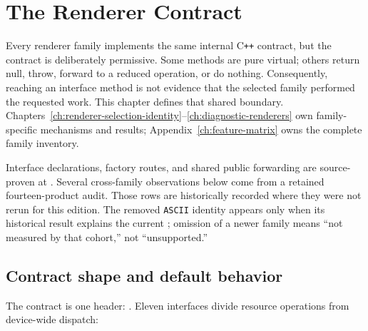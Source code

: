 \chapter{The Renderer Contract}
\label{ch:renderer-contract}
\label{ch:backend-architecture}

Every renderer family implements the same internal C\texttt{++} contract, but the contract is
deliberately permissive. Some methods are pure virtual; others return null, throw, forward to a
reduced operation, or do nothing. Consequently, reaching an interface method is not evidence
that the selected family performed the requested work. This chapter defines that shared boundary.
Chapters~\ref{ch:renderer-selection-identity}--\ref{ch:diagnostic-renderers} own family-specific
mechanisms and results; Appendix~\ref{ch:feature-matrix} owns the complete family inventory.

\begin{evidencenote}
Interface declarations, factory routes, and shared public forwarding are source-proven at
\CnaRevisionShort. Several cross-family observations below come from a retained fourteen-product
audit. Those rows are historically recorded where they were not rerun for this edition. The
removed \texttt{ASCII} identity appears only when its historical result explains the current
; omission of a newer family means ``not measured by that
cohort,'' not ``unsupported.''
\end{evidencenote}

\section{Contract shape and default behavior}

The contract is one header:
.
Eleven interfaces divide resource operations from device-wide dispatch:

